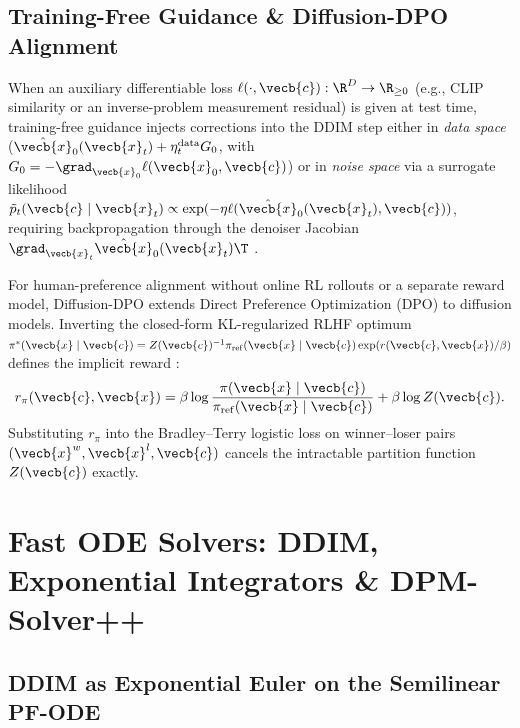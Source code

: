 \documentclass[../../../../master.tex]{subfiles}
\begin{document}
\subsection{Training-Free Guidance \& Diffusion-DPO Alignment}

When an auxiliary differentiable loss $\ell(\cdot, \vecb{c}) : \R^D \to \R_{\ge 0}$ (e.g., CLIP similarity or an inverse-problem measurement residual) is given at test time, training-free guidance injects corrections into the DDIM step either in \emph{data space} ($\hat{\vecb{x}}_0(\vecb{x}_t) + \eta^{\mathrm{data}}_t G_0$, with $G_0 = -\grad_{\vecb{x}_0}\ell(\vecb{x}_0, \vecb{c})$) or in \emph{noise space} via a surrogate likelihood $\tilde{p}_t(\vecb{c}\mid\vecb{x}_t) \propto \exp(-\eta \ell(\hat{\vecb{x}}_0(\vecb{x}_t), \vecb{c}))$, requiring backpropagation through the denoiser Jacobian $\grad_{\vecb{x}_t}\hat{\vecb{x}}_0(\vecb{x}_t)\T$ .

For human-preference alignment without online RL rollouts or a separate reward model, Diffusion-DPO extends Direct Preference Optimization (DPO) to diffusion models. Inverting the closed-form KL-regularized RLHF optimum $\pi^*(\vecb{x}\mid\vecb{c}) = Z(\vecb{c})^{-1}\pi_{\mathrm{ref}}(\vecb{x}\mid\vecb{c})\exp(r(\vecb{c},\vecb{x})/\beta)$ defines the implicit reward :
\begin{equation}
  \label{eq:dsolver:dpo_reward}
  r_\pi(\vecb{c}, \vecb{x}) = \beta\log\frac{\pi(\vecb{x}\mid\vecb{c})}{\pi_{\mathrm{ref}}(\vecb{x}\mid\vecb{c})} + \beta\log Z(\vecb{c}).
\end{equation}
Substituting $r_\pi$ into the Bradley--Terry logistic loss on winner--loser pairs $(\vecb{x}^w, \vecb{x}^l, \vecb{c})$ cancels the intractable partition function $Z(\vecb{c})$ exactly.

\section{Fast ODE Solvers: DDIM, Exponential Integrators \& DPM-Solver++}
\label{sec:dsolver:solvers}

\subsection{DDIM as Exponential Euler on the Semilinear PF-ODE}
\end{document}
